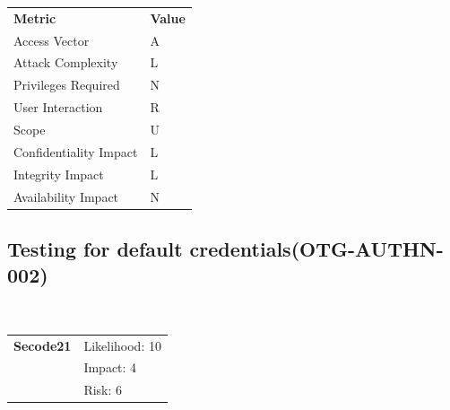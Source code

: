 \documentclass[headsepline,footsepline,footinclude=false,oneside,fontsize=11pt,paper=a4,listof=totoc,bibliography=totoc]{scrbook} %
\begin{document}
\begin{center}
	\begin{tabular}{ll}
		\rowcolor[HTML]{34CDF9}
		{\color[HTML]{ECF4FF} \textbf{Metric}}        & {\color[HTML]{ECF4FF} \textbf{Value}} \\
		\rowcolor[HTML]{BBDAFF}
		{\color[HTML]{333333} Access Vector}          & {\color[HTML]{333333} } A              \\
		\rowcolor[HTML]{ECF4FF}
		{\color[HTML]{333333} Attack Complexity}      & {\color[HTML]{333333} } L              \\
		\rowcolor[HTML]{BBDAFF}
		{\color[HTML]{333333} Privileges Required}    & {\color[HTML]{333333} } N              \\
		\rowcolor[HTML]{ECF4FF}
		{\color[HTML]{333333} User Interaction}       & {\color[HTML]{333333} } R              \\
		\rowcolor[HTML]{BBDAFF}
		{\color[HTML]{333333} Scope}                  & {\color[HTML]{333333} } U              \\
		\rowcolor[HTML]{ECF4FF}
		{\color[HTML]{333333} Confidentiality Impact} & {\color[HTML]{333333} } L              \\
		\rowcolor[HTML]{BBDAFF}
		{\color[HTML]{333333} Integrity Impact}       & {\color[HTML]{333333} } L              \\
		\rowcolor[HTML]{ECF4FF}
		{\color[HTML]{333333} Availability Impact}    & {\color[HTML]{333333} } N
	\end{tabular}
\end{center}

\pagebreak
\subsection{Testing for default credentials(OTG-AUTHN-002)}\
\begin{tabular}{cR{12cm}}
	\textbf{Secode21} & Likelihood: 10\\& Impact: 4\\& Risk: 6
\end{tabular}
\end{document}
